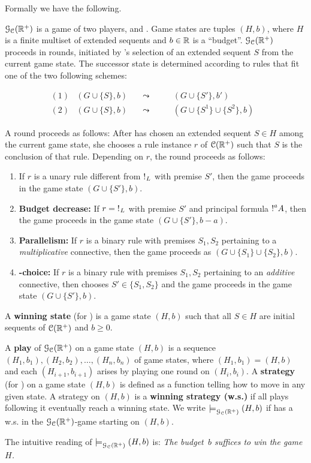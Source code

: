 Formally we have the following.
\begin{definition}\label{definition:GAIMALLR}
    $\mathcal{G}_{\mathcal{C}}(\mathbb{R}^+)$ is a game of two players, \I and \II. Game states are tuples $(H,b)$, where $H$ is a finite multiset of extended sequents and $b\in\mathbb{R}$ is a ``budget''.
$\mathcal{G}_{\mathcal{C}}(\mathbb{R}^+)$ proceeds in rounds, initiated by \I's selection of an extended sequent $S$ from the current game state. The successor state is determined according to rules that fit one of the two following schemes:

\[
\begin{array}{lllll}
{(1)} &(G\cup\{S\},b)&\quad\leadsto\quad&  \quad (G\cup\{S'\},b') & \\
{(2)} &(G\cup\{S\},b)&\quad\leadsto\quad&  \quad (G\cup\{S^1\}\cup\{S^2\},b)
\end{array}
\]

A round proceeds as follows: After \I has chosen an extended sequent $S\in H$ among the current game state, she chooses a rule  instance  $r$ of $\mathcal{C}(\mathbb{R}^+)$ such that $S$ is the conclusion of that rule. Depending on  $r$, the round proceeds as follows:
\begin{enumerate}
\item If $r$ is a unary rule different from $\hbox{$\mathop{!}^{}$}_L$ with premise $S'$, then the game proceeds in the game state $(G\cup\{S'\},b)$.
\item {\bf Budget decrease:} If $r=\hbox{$\mathop{!}^{}$}_L$ with premise $S'$ and principal formula $\hbox{$\mathop{!}^{a}$}A$, then the game proceeds in the game state $(G\cup\{S'\},b-a)$.
\item {\bf Parallelism:} If $r$ is a binary rule with premises $S_1,S_2$ pertaining to a \emph{multiplicative} connective, then the game proceeds as $(G\cup\{S_1\}\cup\{S_2\},b)$.
\item {\bf \II-choice:} If $r$ is a binary rule with premises $S_1,S_2$ pertaining to an \emph{additive} connective, then \II chooses $S'\in\{S_1,S_2\}$ and the game proceeds in the game state $(G\cup\{S'\},b)$.
\end{enumerate}

\noindent A {\bf winning state} (for \I) is a game state $(H,b)$ such that all $S\in H$ are initial sequents of $\mathcal{C}(\mathbb{R}^+)$ and $b\geq 0$.
\end{definition}

\begin{definition}
A {\bf play} of $\mathcal{G}_{\mathcal{C}}(\mathbb{R}^+)$ on a game state $(H,b)$ is a sequence $(H_1,b_1),(H_2,b_2),\ldots,(H_n,b_n)$ of game states, where $(H_1,b_1)=(H,b)$ and each $(H_{i+1},b_{i+1})$ arises by playing one round on $(H_i,b_i)$.
 A {\bf strategy} (for \I) on a game state $(H,b)$ is defined as a function telling \I how to move in any given state. 
 A strategy on $(H,b)$ is a {\bf winning strategy (w.s.)} if all plays following it eventually reach a winning state.
We write $\models^{}_{\mathcal{G}_{\mathcal{C}}(\mathbb{R}^+)}(H,b)$ if \I has a w.s. in the $\mathcal{G}_{\mathcal{C}}(\mathbb{R}^+)$-game starting on $(H,b)$. 
\end{definition}
The intuitive reading of $\models^{}_{\mathcal{G}_{\mathcal{C}}(\mathbb{R}^+)}(H,b)$ is: \textit{The budget~$b$ suffices to win the game $H$.}


